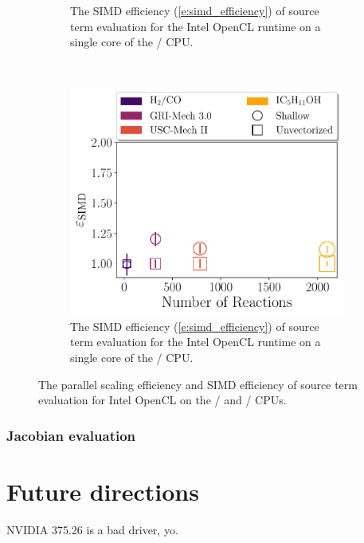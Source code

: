 \documentclass[12pt,number,sort&compress,preprint]{elsarticle}
\begin{document}
\begin{figure}[htbp]
\begin{subfigure}[t]{0.48\linewidth}
      \caption{The SIMD efficiency (\cref{e:simd_efficiency}) of source term evaluation for the Intel OpenCL runtime on a single core of the \avx/ CPU.}
      \label{F:source_simd_scaling}
  \end{subfigure}
  \\
  \begin{subfigure}[t]{0.48\linewidth}
      \includegraphics[width=\textwidth]{source_sse_simd_efficiency.pdf}
      \caption{The SIMD efficiency (\cref{e:simd_efficiency}) of source term evaluation for the Intel OpenCL runtime on a single core of the \sse/ CPU.}
      \label{F:source_sse_simd_scaling}
  \end{subfigure}
  \caption{The parallel scaling efficiency and SIMD efficiency of source term evaluation for Intel OpenCL on the \avx/ and \sse/ CPUs.}
  \label{F:source_scaling}
\end{figure}

\subsubsection{Jacobian evaluation}
\label{S:jacobian_results}

\section{Future directions}
\label{s:future}
NVIDIA 375.26 is a bad driver, yo.
\end{document}
